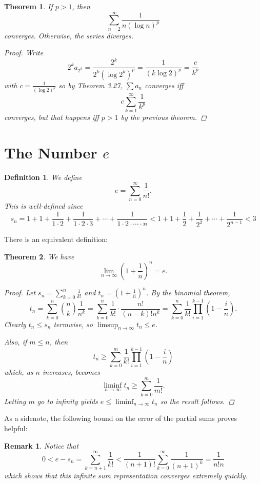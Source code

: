 \documentclass{scrbook}
\renewcommand{\to}{\rightarrow}
\newtheorem{theorem}{Theorem}
\newtheorem{definition}{Definition}
\newtheorem*{remark}{Remark}
\begin{document}
\begin{theorem} %
If $p > 1$, then
\[
	\sum_{n=2}^{\infty} \frac{1}{n (\log n)^p}
\]
converges. Otherwise, the series diverges.

\begin{proof}
Write
\[
	2^k a_{2^k} = \frac{2^k}{2^k (\log 2^k)^p} = \frac{1}{(k \log 2)^p} = \frac{c}{k^p}
\]
with $c = \frac{1}{(\log 2)^p}$ so by Theorem 3.27, $\sum a_n$ converges iff
\[
	c \sum_{k=1}^{\infty} \frac{1}{k^p}
\]
converges, but that happens iff $p > 1$ by the previous theorem.
\end{proof}
\end{theorem}

\section{The Number $e$}

\begin{definition}
We define
\[
	e = \sum_{n=0}^{\infty} \frac{1}{n!}.
\]
This is well-defined since
\[
	s_n = 1 + 1 + \frac{1}{1 \cdot 2} + \frac{1}{1 \cdot 2 \cdot 3} + \dotsb + \frac{1}{1 \cdot 2 \cdot \dotsb \cdot n} < 1 + 1 + \frac{1}{2} + \frac{1}{2^2} + \dotsb + \frac{1}{2^{n-1}} < 3
\]
\end{definition}

There is an equivalent definition:
\begin{theorem} %
We have
\[
	\lim_{n \to \infty} \left(1 + \frac{1}{n}\right)^n = e.
\]

\begin{proof}
Let $s_n = \sum_{k=0}^{n} \frac{1}{k!}$ and $t_n = \left(1 + \frac{1}{n}\right)^n$. By the binomial theorem,
\[
	t_n = \sum_{k=0}^{n} \binom{n}{k} \frac{1}{n^k} = \sum_{k=0}^{n} \frac{1}{k!} \cdot \frac{n!}{(n-k)! n^k} = \sum_{k=0}^{n} \frac{1}{k!} \prod_{i=1}^{k-1} \left(1 - \frac{i}{n}\right).
\]
Clearly $t_n \le s_n$ termwise, so $\limsup_{n \to \infty} t_n \le e$.

Also, if $m \le n$, then
\[
	t_n \ge \sum_{k=0}^{m} \frac{1}{k!} \prod_{i=1}^{k-1} \left(1 - \frac{i}{n}\right)
\]
which, as $n$ increases, becomes
\[
	\liminf_{n \to \infty} t_n \ge \sum_{k=0}^{m} \frac{1}{m!}.
\]
Letting $m$ go to infinity yields $e \le \liminf_{n \to \infty} t_n$ so the result follows.
\end{proof}
\end{theorem}

As a sidenote, the following bound on the error of the partial sums proves helpful:
\begin{remark}
Notice that
\[
	0 < e - s_n = \sum_{k=n+1}^{\infty} \frac{1}{k!} < \frac{1}{(n + 1)!} \sum_{k=0}^{\infty} \frac{1}{(n + 1)^k} = \frac{1}{n!n}
\]
which shows that this infinite sum representation converges extremely quickly.
\end{remark}
\end{document}
